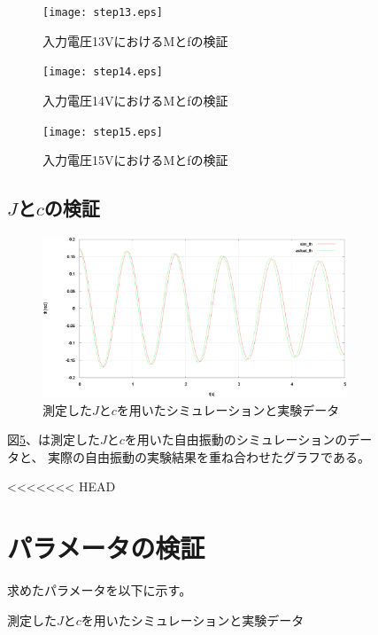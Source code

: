 \documentclass[a4j,11pt,twoside]{ujbook}
\begin{document}
\begin{figure}[htbp]
\begin{center}
	\begin{figure}[htbp]
		\begin{center}
			\texttt{[image: step13.eps]}
			\caption{入力電圧13VにおけるMとfの検証}
			\label{fig:step13}
		\end{center}
	\end{figure}
	
	\begin{figure}[htbp]
		\begin{center}
			\texttt{[image: step14.eps]}
			\caption{入力電圧14VにおけるMとfの検証}
			\label{fig:step14}
		\end{center}
	\end{figure}
	
	\begin{figure}[htbp]
		\begin{center}
			\texttt{[image: step15.eps]}
			\caption{入力電圧15VにおけるMとfの検証}
			\label{fig:step15}
		\end{center}
	\end{figure}
	
	
	\subsection{$J$と$c$の検証}
	\begin{figure}[htbp]
		\begin{center}
			\includegraphics[width = 1.0 \linewidth]{freePendulum.eps}
			\caption{測定した$J$と$c$を用いたシミュレーションと実験データ}
			\label{fig:Jc}
		\end{center}
	\end{figure}
	図\ref{fig:Jc}、は測定した$J$と$c$を用いた自由振動のシミュレーションのデータと、
	実際の自由振動の実験結果を重ね合わせたグラフである。


<<<<<<< HEAD
\section{パラメータの検証}
求めたパラメータを以下に示す。


\end{center}
\end{figure}
\end{document}
